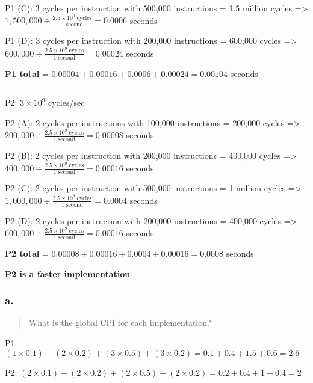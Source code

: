 \documentclass[]{article}
\begin{document}
P1 (C): 3 cycles per instruction with 500,000 instructions = 1.5 million
cycles
=\textgreater{}\(1,500,000 \div \frac{2.5 \times 10^9 \;\text{cycles}}{1 \;\text{second}} = 0.0006\)
seconds

P1 (D): 3 cycles per instruction with 200,000 instructions = 600,000
cycles =\textgreater{}
\(600,000 \div \frac{2.5 \times 10^9 \;\text{cycles}}{1 \;\text{second}} = 0.00024\)
seconds

\textbf{P1 total} = \(0.00004 + 0.00016 + 0.0006 + 0.00024 = 0.00104\)
seconds

\begin{center}\rule{0.5\linewidth}{\linethickness}\end{center}

P2: \(3 \times 10^9\) cycles/sec

P2 (A): 2 cycles per instructions with 100,000 instructions = 200,000
cycles =\textgreater{}
\(200,000 \div \frac{2.5 \times 10^9 \;\text{cycles}}{1 \;\text{second}} = 0.00008\)
seconds

P2 (B): 2 cycles per instruction with 200,000 instructions = 400,000
cycles =\textgreater{}
\(400,000 \div \frac{2.5 \times 10^9 \;\text{cycles}}{1 \;\text{second}} = 0.00016\)
seconds

P2 (C): 2 cycles per instruction with 500,000 instructions = 1 million
cycles
=\textgreater{}\(1,000,000 \div \frac{2.5 \times 10^9 \;\text{cycles}}{1 \;\text{second}} = 0.0004\)
seconds

P2 (D): 2 cycles per instruction with 200,000 instructions = 400,000
cycles =\textgreater{}
\(600,000 \div \frac{2.5 \times 10^9 \;\text{cycles}}{1 \;\text{second}} = 0.00016\)
seconds

\textbf{P2 total} = \(0.00008 + 0.00016 + 0.0004 + 0.00016 = 0.0008\)
seconds

\textbf{P2 is a faster implementation}

\subsubsection{a.}\label{header-n4854}

\begin{quote}
What is the global CPI for each implementation?
\end{quote}

P1:
\((1 \times 0.1) + (2 \times 0.2) + (3 \times 0.5) +(3 \times 0.2) = 0.1 + 0.4 + 1.5 + 0.6 = 2.6\)

P2:
\((2 \times 0.1) + (2 \times 0.2) + (2 \times 0.5) +(2 \times 0.2) = 0.2 + 0.4 + 1 + 0.4 = 2\)
\end{document}
